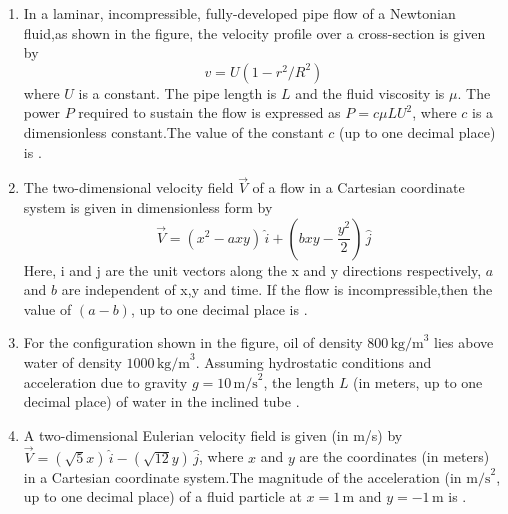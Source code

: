 \documentclass[journal,12pt,onecolumn]{IEEEtran}
\theoremstyle{remark}
\begin{document}
\begin{enumerate}
\begin{enumerate}
    \end{enumerate}

    \item In a laminar, incompressible, fully-developed pipe flow of a Newtonian fluid,as shown in the figure, the velocity profile over a cross-section is given by $$v = U(1 - r^2/R^2)$$ where $U$ is a constant. The pipe length is $L$ and the fluid viscosity is $\mu$. The power $P$ required to sustain the flow is expressed as $P = c\mu LU^2$, where $c$ is a dimensionless constant.The value of the constant $c$ (up to one decimal place) is {\underline{\hspace{2cm}}}.
    \begin{figure}[H]
        \centering
          
    \end{figure}

    \item The two-dimensional velocity field $\vec{V}$ of a flow in a Cartesian coordinate system is given in dimensionless form by $$\vec{V} = (x^2-axy) \, \hat{i} + (bxy-\frac{y^2}{2}) \, \hat{j}$$
    Here, i and j are the unit vectors along the x and y directions respectively, $a$ and $b$ are independent of x,y and time. If the flow is incompressible,then the value of $(a - b)$, up to one decimal place is {\underline{\hspace{2cm}}}.

    \item For the configuration shown in the figure, oil of density $800 \, \text{kg/m}^3$ lies above water of density $1000 \, \text{kg/m}^3$. Assuming hydrostatic conditions and acceleration due to gravity $g = 10 \, \text{m/s}^2$, the length $L$ (in meters, up to one decimal place) of water in the inclined tube {\underline{\hspace{2cm}}}.
     \begin{figure}[H]
        \centering
          
    \end{figure}

    \item A two-dimensional Eulerian velocity field is given (in m/s) by $\vec{V} = \left( \sqrt{5} x \right) \, \hat{i} - \left( \sqrt{12} y \right) \, \hat{j}$, where $x$ and $y$ are the coordinates (in meters) in a Cartesian coordinate system.The magnitude of the acceleration (in $\text{m/s}^2$, up to one decimal place) of a fluid particle at $x = 1 \, \text{m}$ and $y = -1 \, \text{m}$ is {\underline{\hspace{2cm}}}.
   


\end{enumerate}
\end{document}

